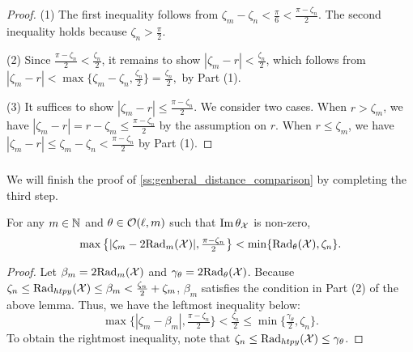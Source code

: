 \begin{proof}
    	(1) The first inequality follows from $\zeta_m - \zeta_n < \tfrac{\pi}{6} < \tfrac{\pi - \zeta_n}{2}$.
        The second inequality holds because $\zeta_n > \tfrac{\pi}{2}$.

        (2) Since $\tfrac{\pi - \zeta_n}{2} < \tfrac{\zeta_n}{2}$, it remains to show $|\zeta_m  - r | < \tfrac{\zeta_n}{2}$, which follows from
    	\(
    	|\zeta_m  - r | < \max\big\{\zeta_m - \zeta_n, \tfrac{\zeta_n}{2}\big\} = \tfrac{\zeta_n}{2},
    	\) by Part (1).

    	(3) %
        It suffices to show $|\zeta_m  - r | \leq \tfrac{\pi - \zeta_n}{2}$.
        We consider two cases.
        When $r > \zeta_m$, we have
    	$|\zeta_m  - r | = r - \zeta_m \leq
        \tfrac{\pi - \zeta_n}{2}
    	$ by the assumption on $r$.
    	When $r \leq \zeta_m$, we have
    	\(
    	|\zeta_m  - r | \leq \zeta_m - \zeta_n
    	< \tfrac{\pi - \zeta_n}{2}
    	\) by Part (1).
\end{proof}

\subsubsection{}
\label{sss:comparison_lemma_zeta_n}

We will finish the proof of \cref{ss:genberal_distance_comparison} by completing the third step.

\medskip \lemma
For any $m \in \mathbb{N}$ and $\theta \in \mathcal{O}(\ell, m)$ such that $\operatorname{Im} \theta_{\mathcal{X}}$ is non-zero,
\[\max\big\{|\zeta_m  - 2\mathrm{Rad}_{m}(\mathcal{X}) |, \tfrac{\pi - \zeta_n}{2}\big\} < \min\{\mathrm{Rad}_{\theta}(\mathcal{X}), \zeta_n\}.\]
\begin{proof}
    Let $\beta_m = 2\mathrm{Rad}_{m}(\mathcal{X})$ and $\gamma_\theta = 2\mathrm{Rad}_{\theta}(\mathcal{X})$.
    Because \(\zeta_n \leq \mathrm{Rad}_{htpy}(\mathcal{X}) \leq \beta_m < \tfrac{\zeta_n}{2} + \zeta_m\), $\beta_m$ satisfies the condition in Part (2) of the above lemma.
    Thus, we have the leftmost inequality below:
    \[
    \max\big\{|\zeta_m - \beta_m|, \tfrac{\pi - \zeta_n}{2}\big\} < \tfrac{\zeta_n}{2}
    \leq
    \min\big\{\tfrac{\gamma_\theta}{2}, \zeta_n\big\}.
    \]
    To obtain the rightmost inequality, note that \(\zeta_n \leq \mathrm{Rad}_{htpy}(\mathcal{X}) \leq \gamma_\theta\).
\end{proof}

